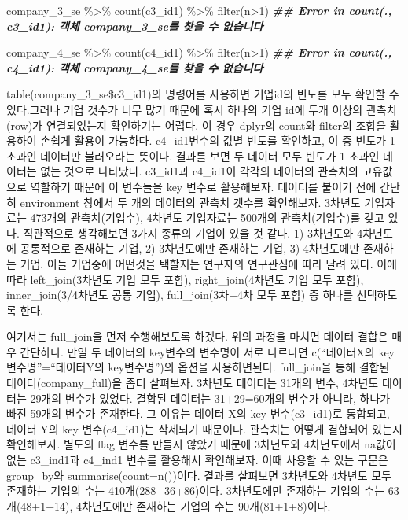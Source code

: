 \documentclass[
]{book}
\newenvironment{Shaded}{\begin{snugshade}}{\end{snugshade}}
\newcommand{\DecValTok}[1]{\textcolor[rgb]{0.00,0.00,0.81}{#1}}
\newcommand{\DocumentationTok}[1]{\textcolor[rgb]{0.56,0.35,0.01}{\textbf{\textit{#1}}}}
\newcommand{\FunctionTok}[1]{\textcolor[rgb]{0.00,0.00,0.00}{#1}}
\newcommand{\NormalTok}[1]{#1}
\newcommand{\SpecialCharTok}[1]{\textcolor[rgb]{0.00,0.00,0.00}{#1}}
\theoremstyle{definition}
\theoremstyle{definition}
\theoremstyle{definition}
\theoremstyle{definition}
\theoremstyle{remark}
\begin{document}
\begin{Shaded}
\begin{Highlighting}[]
\NormalTok{company\_3\_se }\SpecialCharTok{\%\textgreater{}\%} 
  \FunctionTok{count}\NormalTok{(c3\_id1) }\SpecialCharTok{\%\textgreater{}\%} 
  \FunctionTok{filter}\NormalTok{(n}\SpecialCharTok{\textgreater{}}\DecValTok{1}\NormalTok{)}
\DocumentationTok{\#\# Error in count(., c3\_id1): 객체 \textquotesingle{}company\_3\_se\textquotesingle{}를 찾을 수 없습니다}

\NormalTok{company\_4\_se }\SpecialCharTok{\%\textgreater{}\%} 
  \FunctionTok{count}\NormalTok{(c4\_id1) }\SpecialCharTok{\%\textgreater{}\%} 
  \FunctionTok{filter}\NormalTok{(n}\SpecialCharTok{\textgreater{}}\DecValTok{1}\NormalTok{)}
\DocumentationTok{\#\# Error in count(., c4\_id1): 객체 \textquotesingle{}company\_4\_se\textquotesingle{}를 찾을 수 없습니다}
\end{Highlighting}
\end{Shaded}

table(company\_3\_se\$c3\_id1)의 명령어를 사용하면 기업id의 빈도를 모두 확인할 수 있다.그러나 기업 갯수가 너무 많기 때문에 혹시 하나의 기업 id에 두개 이상의 관측치(row)가 연결되었는지 확인하기는 어렵다. 이 경우 dplyr의 count와 filter의 조합을 활용하여 손쉽게 활용이 가능하다. c4\_id1변수의 값별 빈도를 확인하고, 이 중 빈도가 1 초과인 데이터만 불러오라는 뜻이다. 결과를 보면 두 데이터 모두 빈도가 1 초과인 데이터는 없는 것으로 나타났다.
c3\_id1과 c4\_id1이 각각의 데이터의 관측치의 고유값으로 역할하기 때문에 이 변수들을 key 변수로 활용해보자. 데이터를 붙이기 전에 간단히 environment 창에서 두 개의 데이터의 관측치 갯수를 확인해보자. 3차년도 기업자료는 473개의 관측치(기업수), 4차년도 기업자료는 500개의 관측치(기업수)를 갖고 있다. 직관적으로 생각해보면 3가지 종류의 기업이 있을 것 같다. 1) 3차년도와 4차년도에 공통적으로 존재하는 기업, 2) 3차년도에만 존재하는 기업, 3) 4차년도에만 존재하는 기업. 이들 기업중에 어떤것을 택할지는 연구자의 연구관심에 따라 달려 있다. 이에 따라 left\_join(3차년도 기업 모두 포함), right\_join(4차년도 기업 모두 포함), inner\_join(3/4차년도 공통 기업), full\_join(3차+4차 모두 포함) 중 하나를 선택하도록 한다.

여기서는 full\_join을 먼저 수행해보도록 하겠다. 위의 과정을 마치면 데이터 결합은 매우 간단하다. 만일 두 데이터의 key변수의 변수명이 서로 다르다면 c(``데이터X의 key변수명''=``데이터Y의 key변수명'')의 옵션을 사용하면된다. full\_join을 통해 결합된 데이터(company\_full)을 좀더 살펴보자. 3차년도 데이터는 31개의 변수, 4차년도 데이터는 29개의 변수가 있었다. 결합된 데이터는 31+29=60개의 변수가 아니라, 하나가 빠진 59개의 변수가 존재한다. 그 이유는 데이터 X의 key 변수(c3\_id1)로 통합되고, 데이터 Y의 key 변수(c4\_id1)는 삭제되기 때문이다. 관측치는 어떻게 결합되어 있는지 확인해보자. 별도의 flag 변수를 만들지 않았기 때문에 3차년도와 4차년도에서 na값이 없는 c3\_ind1과 c4\_ind1 변수를 활용해서 확인해보자. 이때 사용할 수 있는 구문은 group\_by와 summarise(count=n())이다. 결과를 살펴보면 3차년도와 4차년도 모두 존재하는 기업의 수는 410개(288+36+86)이다. 3차년도에만 존재하는 기업의 수는 63개(48+1+14), 4차년도에만 존재하는 기업의 수는 90개(81+1+8)이다.
\end{document}
